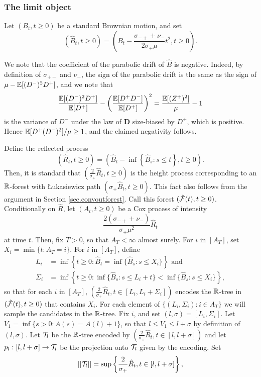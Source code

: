 \subsubsection{The limit object}\label{subsubsec.samplecontinuousobject}
Let $(B_t,t\geq 0)$ be a standard Brownian motion, and set $$\left(\hat{B}_t,t\geq 0\right)=\left(B_t-\frac{\sigma_{-+}+\nu_-}{2\sigma_+\mu}t^2,t\geq 0\right).$$ 
\begin{remark}
We note that the coefficient of the parabolic drift of $\hat{B}$ is negative. Indeed, by definition of $\sigma_{+-}$ and $\nu_-$, the sign of the parabolic drift is the same as the sign of $\mu-{\mathbb E}[(D^-)^2D^+]$, and we note that
$$\frac{{\mathbb E}[(D^-)^2D^+]}{{\mathbb E}[D^+]}-\left(\frac{{\mathbb E}[D^+D^-]}{{\mathbb E}[D^+]}\right)^2=\frac{{\mathbb E}[(Z^+)^2]}{\mu}-1$$
is the variance of $D^-$ under the law of $\mathbf{D}$ size-biased by $D^+$, which is positive. Hence ${\mathbb E}[D^+(D^-)^2]/\mu\geq 1$, and the claimed negativity follows. 

\end{remark}
Define the reflected process
$$(\hat{R}_t,t\geq 0)= \left(\hat{B}_t-\inf\left\{\hat{B}_s: s\leq t\right\},t\geq 0\right).$$
Then, it is standard that $\left(\frac{2}{\sigma_+}\hat{R}_t,t\geq 0\right)$ is the height process corresponding to an ${\mathbb R}$-forest with \L ukasiewicz path $\left(\sigma_+\hat{B}_t,t\geq 0\right)$.  This fact also follows from the argument in Section \ref{sec.convoutforest}. Call this forest $(\hat{{\mathcal F}}(t),t\geq 0)$. \\
Conditionally on $\hat{R}$, let $(A_t,t\geq 0)$ be a Cox process of intensity $$\frac{2(\sigma_{-+}+\nu_-)}{\sigma_+\mu^2} \hat{R}_t$$ at time $t$. Then, fix $T>0$, so that $A_T<\infty$ almost surely. For $i$ in $\left[A_T\right]$, set $X_i=\min\{t:A_T=i\}$. For $i$ in $\left[A_T\right]$, define
\begin{align*}
L_i&=\inf\left\{t\geq 0:\hat{B}_t=\inf\{\hat{B}_s:s\leq X_i\}\right\}\text{ and}\\
\Sigma_i&=\inf\left\{ t\geq 0: \inf\{\hat{B}_s:s\leq L_i+t\} < \inf\{\hat{B}_s:s\leq X_i\}\right\},
\end{align*}
so that for each $i$ in $\left[A_T\right]$, $\left(\frac{2}{\sigma_+}\hat{R}_t,t\in [L_i,L_i+\Sigma_i]\right)$ encodes the ${\mathbb R}$-tree in $(\hat{{\mathcal F}}(t),t\geq 0)$ that contains $X_i$. For each element of $\{(L_i,\Sigma_i):i\in A_T\}$ we will sample the candidates in the ${\mathbb R}$-tree. Fix $i$, and set $(l,\sigma)=[L_i,\Sigma_i]$. Let $V_1=\inf\{s>0:A(s)=A(l)+1\}$, so that $l\leq V_1\leq l+\sigma$ by definition of $(l,\sigma)$. Let ${\mathcal T}_l$ be the ${\mathbb R}$-tree encoded by $\left(\frac{2}{\sigma_+}\hat{R}_t,t\in [l,l+\sigma]\right)$ and let $p_l:[l,l+\sigma]\to {\mathcal T}_l$ be the projection onto ${\mathcal T}_l$ given by the encoding. Set $$||{\mathcal T}_l||=\sup\left\{\frac{2}{\sigma_+}\hat{R}_t,t\in [l,l+\sigma]\right\},$$
